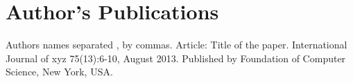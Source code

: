 
\chapter{Author's Publications}
Authors names separated , by commas. Article: Title of the paper. International Journal of xyz 75(13):6-10, August 2013. Published by Foundation of Computer Science, New York, USA.

